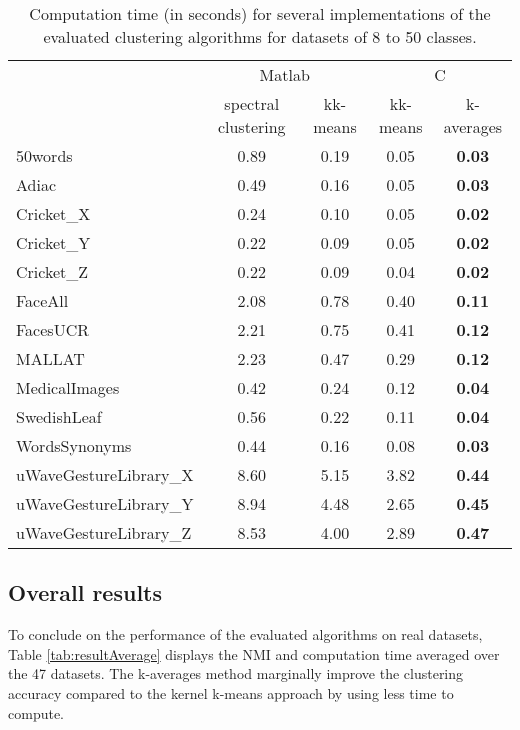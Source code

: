 \documentclass[10pt,letterpaper]{article}
\begin{document}
\begin{table}
\begin{center}
\caption{Computation time (in seconds) for several implementations of the evaluated clustering algorithms for datasets of 8 to 50 classes.}
\label{tab:resultSpeed-8}
\begin{tabular}{lcccc}
  & \multicolumn{2}{c}{Matlab} & \multicolumn{2}{c}{C} \\
  & spectral clustering & kk-means & kk-means & k-averages \\
\hline
50words & 0.89 & 0.19 & 0.05 & \textbf{0.03} \\
Adiac & 0.49 & 0.16 & 0.05 & \textbf{0.03} \\
Cricket\_X & 0.24 & 0.10 & 0.05 & \textbf{0.02} \\
Cricket\_Y & 0.22 & 0.09 & 0.05 & \textbf{0.02} \\
Cricket\_Z & 0.22 & 0.09 & 0.04 & \textbf{0.02} \\
FaceAll & 2.08 & 0.78 & 0.40 & \textbf{0.11} \\
FacesUCR & 2.21 & 0.75 & 0.41 & \textbf{0.12} \\
MALLAT & 2.23 & 0.47 & 0.29 & \textbf{0.12} \\
MedicalImages & 0.42 & 0.24 & 0.12 & \textbf{0.04} \\
SwedishLeaf & 0.56 & 0.22 & 0.11 & \textbf{0.04} \\
WordsSynonyms & 0.44 & 0.16 & 0.08 & \textbf{0.03} \\
uWaveGestureLibrary\_X & 8.60 & 5.15 & 3.82 & \textbf{0.44} \\
uWaveGestureLibrary\_Y & 8.94 & 4.48 & 2.65 & \textbf{0.45} \\
uWaveGestureLibrary\_Z & 8.53 & 4.00 & 2.89 & \textbf{0.47} \\
\end{tabular}
\end{center}
\end{table}


\subsection{Overall results}

To conclude on the performance of the evaluated algorithms on real datasets, Table \ref{tab:resultAverage} displays the NMI and computation time averaged over the 47 datasets. The k-averages method marginally improve the clustering accuracy compared to the kernel k-means approach by using less time to compute.
\end{document}
